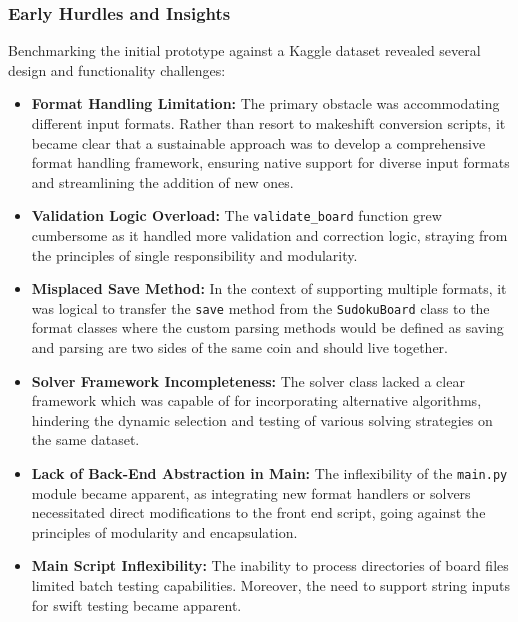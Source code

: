 \documentclass[11pt]{article}
\begin{document}
\subsubsection{Early Hurdles and Insights}

Benchmarking the initial prototype against a Kaggle dataset revealed several design and functionality challenges:

\begin{itemize}
\item \textbf{Format Handling Limitation:} The primary obstacle was accommodating different input formats. Rather than resort to makeshift conversion scripts, it became clear that a sustainable approach was to develop a comprehensive format handling framework, ensuring native support for diverse input formats and streamlining the addition of new ones.

\item \textbf{Validation Logic Overload:} The \texttt{validate\_board} function grew cumbersome as it handled more validation and correction logic, straying from the principles of single responsibility and modularity.

\item \textbf{Misplaced Save Method:} In the context of supporting multiple formats, it was logical to transfer the \texttt{save} method from the \texttt{SudokuBoard} class to the format classes where the custom parsing methods would be defined as saving and parsing are two sides of the same coin and should live together.

\item \textbf{Solver Framework Incompleteness:} The solver class lacked a clear framework which was capable of for incorporating alternative algorithms, hindering the dynamic selection and testing of various solving strategies on the same dataset.

\item \textbf{Lack of Back-End Abstraction in Main:} The inflexibility of the \texttt{main.py} module became apparent, as integrating new format handlers or solvers necessitated direct modifications to the front end script, going against the principles of modularity and encapsulation.

\item \textbf{Main Script Inflexibility:} The inability to process directories of board files limited batch testing capabilities. Moreover, the need to support string inputs for swift testing became apparent. 
\end{itemize}
\end{document}
